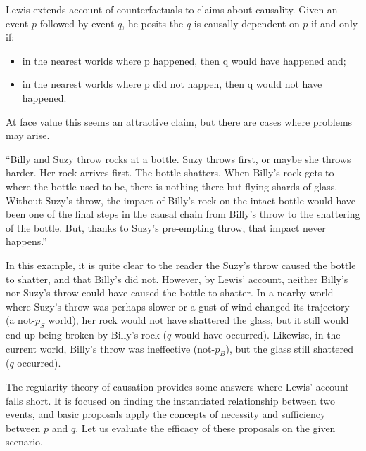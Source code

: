 \documentclass{article}
\begin{document}
Lewis extends account of counterfactuals to claims about causality. Given an event $p$ followed by event $q$, he posits the $q$ is causally dependent on $p$ if and only if:
    \begin{itemize}
    \item in the nearest worlds where p happened, then q would have happened and;
    \item in the nearest worlds where p did not happen, then q would not have happened.
    \end{itemize}
At face value this seems an attractive claim, but there are cases where problems may arise.

\begin{displayquote}
``Billy and Suzy throw rocks at a bottle. Suzy throws first, or maybe she throws harder. Her rock arrives first. The bottle shatters. When Billy's rock gets to where the bottle used to be, there is nothing there but flying shards of glass. Without Suzy's throw, the impact of Billy's rock on the intact bottle would have been one of the final steps in the causal chain from Billy's throw to the shattering of the bottle. But, thanks to Suzy's pre-empting throw, that impact never happens.''
\end{displayquote}

In this example, it is quite clear to the reader the Suzy's throw caused the bottle to shatter, and that Billy's did not. However, by Lewis' account, neither Billy's nor Suzy's throw could have caused the bottle to shatter. In a nearby world where Suzy's throw was perhaps slower or a gust of wind changed its trajectory (a not-$p_S$ world), her rock would not have shattered the glass, but it still would end up being broken by Billy's rock ($q$ would have occurred). Likewise, in the current world, Billy's throw was ineffective (not-$p_B$), but the glass still shattered ($q$ occurred).

The regularity theory of causation provides some answers where Lewis' account falls short. It is focused on finding the instantiated relationship between two events, and basic proposals apply the concepts of necessity and sufficiency between $p$ and $q$. Let us evaluate the efficacy of these proposals on the given scenario.
\end{document}
